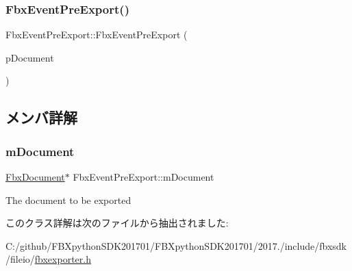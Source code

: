 \subsubsection{\texorpdfstring{Fbx\+Event\+Pre\+Export()}{FbxEventPreExport()}}
{\footnotesize\ttfamily Fbx\+Event\+Pre\+Export\+::\+Fbx\+Event\+Pre\+Export (\begin{DoxyParamCaption}\item[{\hyperlink{class_fbx_document}{Fbx\+Document} $\ast$}]{p\+Document }\end{DoxyParamCaption})}



\subsection{メンバ詳解}
\mbox{\label{class_fbx_event_pre_export_aee74a30348fc851b3690a90c99b0a4b8}} 
\subsubsection{\texorpdfstring{m\+Document}{mDocument}}
{\footnotesize\ttfamily \hyperlink{class_fbx_document}{Fbx\+Document}$\ast$ Fbx\+Event\+Pre\+Export\+::m\+Document}



The document to be exported 



このクラス詳解は次のファイルから抽出されました\+:\begin{DoxyCompactItemize}
\item 
C\+:/github/\+F\+B\+Xpython\+S\+D\+K201701/\+F\+B\+Xpython\+S\+D\+K201701/2017./include/fbxsdk/fileio/\hyperlink{fbxexporter_8h}{fbxexporter.\+h}\end{DoxyCompactItemize}
